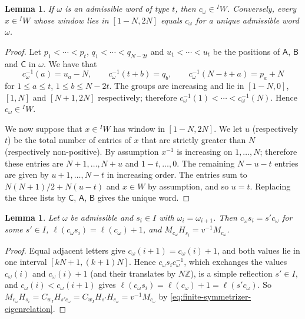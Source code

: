 \documentclass[11pt,a4paper,reqno]{amsart}
\numberwithin{equation}{section}
\newtheorem{lemma}[theorem]{Lemma}
\theoremstyle{definition}
\theoremstyle{remark}
\theoremstyle{plain}
\newcommand{\A}{\mathsf A}
\newcommand{\B}{\mathsf B}
\newcommand{\CC}{\mathsf C}
\begin{document}
\begin{lemma}\label{lem:words}
If $\omega$ is an admissible word of type $t$, then $c_\omega\in{}^IW$. Conversely, every $x\in{}^IW$
whose window lies in $[1-N,2N]$ equals $c_\omega$ for a unique admissible word $\omega$.
\end{lemma}
\begin{proof}
Let $p_1<\cdots<p_t$, $q_1<\cdots<q_{N-2t}$ and $u_1<\cdots<u_t$ be the positions of $\A$, $\B$ and $\CC$ in $\omega$.
We have that 
\[
 c_\omega^{-1}(a)=u_a-N,\qquad
 c_\omega^{-1}(t+b)=q_b,\qquad
 c_\omega^{-1}(N-t+a)=p_a+N
\]
for $1\leq a\leq t$, $1\leq b\leq N-2t$. The groups are increasing 
and   lie in $[1-N,0]$, $[1,N]$ and $[N+1,2N]$ respectively; therefore 
$c_\omega^{-1}(1)<\cdots<c_\omega^{-1}(N)$. Hence $c_\omega\in{}^IW$.

We now suppose that  $x\in{}^IW$ has window in $[1-N,2N]$.
We let $u$ (respectively  $t$) be the total number  of entries
of $x$ that are
strictly greater than $N$ (respectively non-positive). 
By assumption $x^{-1}$ is increasing on $1,\ldots,N$;
therefore these entries are $N+1,\ldots,N+u$ and $1-t,\ldots,0$. 
The remaining $N-u-t$ entries 
are given by $u+1,\ldots,N-t$ in increasing order.
The entries sum to
$N(N+1)/2+N(u-t)$ and $x\in W$ by assumption, and  so $u=t$. Replacing the three lists by $\CC$, $\A$, $\B$ gives the
unique word.
\end{proof}

\begin{lemma}\label{lem:equal-letters}
Let $\omega$ be admissible and $s_i\in I$ with $\omega_i=\omega_{i+1}$. Then $c_\omega s_i=s'c_\omega$ for some $s'\in I$,
$\ell(c_\omega s_i)=\ell(c_\omega)+1$, and $M_{c_\omega}H_{s_i}=v^{-1}M_{c_\omega}$.
\end{lemma}
\begin{proof}
Equal adjacent letters give $c_\omega(i+1)=c_\omega(i)+1$, and both values lie in one interval $[kN+1,(k+1)N]$.
Hence $c_\omega s_ic_\omega^{-1}$, which exchanges the values $c_\omega(i)$ and $c_\omega(i)+1$ (and their translates by $N\mathbb Z$),
is a simple reflection $s'\in I$, and $c_\omega(i)<c_\omega(i+1)$ gives $\ell(c_\omega s_i)=\ell(c_\omega)+1=\ell(s'c_\omega)$.
So $M_{c_\omega}H_{s_i}=C_{w_I}H_{s'c_\omega}=C_{w_I}H_{s'}H_{c_\omega}=v^{-1}M_{c_\omega}$ by
\eqref{eq:finite-symmetrizer-eigenrelation}.
\end{proof}
\end{document}
